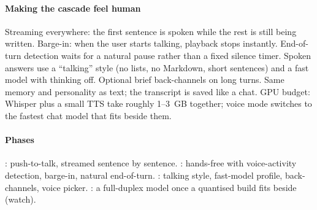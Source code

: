 \paragraph{Making the cascade feel human} Streaming everywhere: the first sentence is spoken while the rest is still being written. Barge-in: when the user starts talking, playback stops instantly. End-of-turn detection waits for a natural pause rather than a fixed silence timer. Spoken answers use a ``talking'' style (no lists, no Markdown, short sentences) and a fast model with thinking off. Optional brief back-channels on long turns. Same memory and personality as text; the transcript is saved like a chat. GPU budget: Whisper plus a small TTS take roughly 1--3~GB together; voice mode switches to the fastest chat model that fits beside them.

\paragraph{Phases} : push-to-talk, streamed sentence by sentence. : hands-free with voice-activity detection, barge-in, natural end-of-turn. : talking style, fast-model profile, back-channels, voice picker. : a full-duplex model once a quantised build fits beside \hivi{} (watch).
